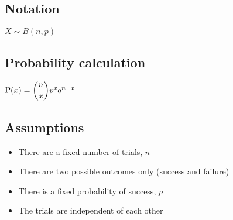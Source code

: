\subsection{Notation}
$X \sim B(n,p)$
\subsection{Probability calculation}
$\text{P}(x) = \dbinom{n}{x} p^x q^{n-x}$
\subsection{Assumptions}
\begin{itemize}
	\item There are a fixed number of trials, $n$
	\item There are two possible outcomes only (success and failure)
	\item There is a fixed probability of success, $p$
	\item The trials are independent of each other
\end{itemize}
